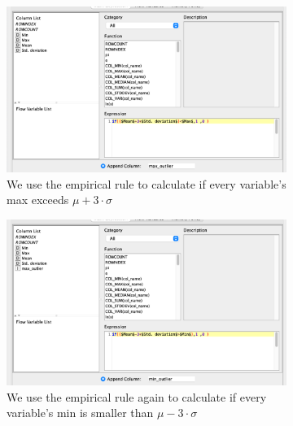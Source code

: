 \documentclass[11pt]{article}
\begin{document}
				\begin{figure}[H]
					\centering
					\begin{subfigure}{0.4\textwidth}
						\includegraphics[width=\textwidth]{res/t0/t03/t03-math-formula-max-outliers-conf}
						\caption{We use the empirical rule to calculate if every variable's max exceeds $\mu + 3\cdot\sigma$}
						\label{fig:first}
					\end{subfigure}
					\hfill
					\begin{subfigure}{0.4\textwidth}
						\includegraphics[width=\textwidth]{res/t0/t03/t03-math-formula-min-outliers-conf}
						\caption{We use the empirical rule again to calculate if every variable's min is smaller than $\mu - 3\cdot\sigma$}
						\label{fig:second}
					\end{subfigure}
					\hfill
					\begin{subfigure}{0.4\textwidth}

\end{subfigure}
\end{figure}
\end{document}
